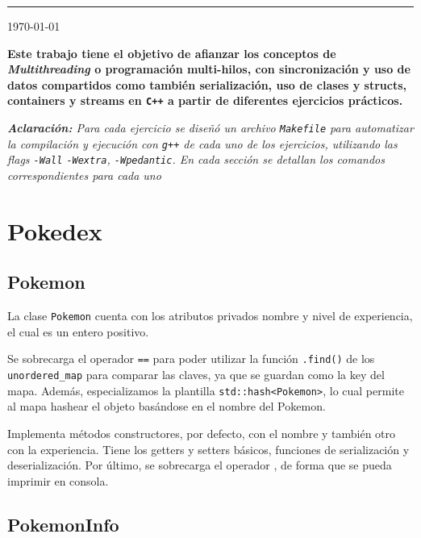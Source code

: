 \documentclass[11pt, a4paper]{article}
\begin{document}
{\noindent\rule{\textwidth}{0.5pt}}


\begin{center}
    {\large \today}
\end{center}

\begin{multicols}{2}

{\bfseries\selectfont Este trabajo tiene el objetivo de afianzar los conceptos de
\textit{Multithreading} o programación multi-hilos, con sincronización y uso de datos compartidos como también serialización, uso de clases y structs, containers y streams en \texttt{C++} a partir de diferentes ejercicios prácticos.
}
\begin{center}
    \small\itshape\textbf{Aclaración:} Para cada ejercicio se diseñó un archivo \texttt{Makefile} para automatizar la compilación y ejecución con \texttt{g++} de cada uno de los ejercicios, utilizando las flags \texttt{-Wall} \texttt{-Wextra}, \texttt{-Wpedantic}. En cada sección se detallan los comandos correspondientes para cada uno 
\end{center}

\section{Pokedex}

\subsection{Pokemon}

La clase \texttt{Pokemon} cuenta con los atributos privados nombre y nivel de experiencia, el cual es un entero positivo.

Se sobrecarga el operador \texttt{==} para poder utilizar la función \texttt{.find()} de los \texttt{unordered\_map} para comparar las claves, ya que se guardan como la key del mapa. Además, especializamos la plantilla \texttt{std::hash<Pokemon>}, lo cual permite al mapa hashear el objeto basándose en el nombre del Pokemon.

Implementa métodos constructores, por defecto, con el nombre y también otro con la experiencia. Tiene los getters y setters básicos, funciones de serialización y deserialización. Por último, se sobrecarga el operador \texttt{\<\<}, de forma que se pueda imprimir en consola.

\subsection{PokemonInfo}




\end{multicols}
\end{document}
